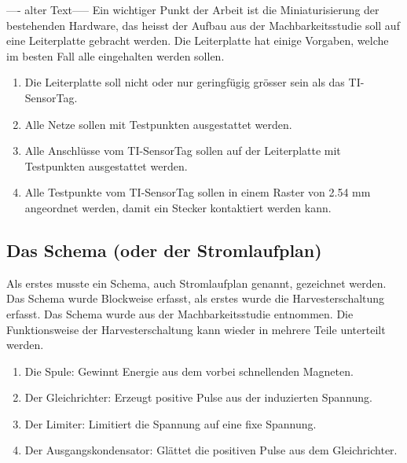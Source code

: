 ---- alter Text-----                             
Ein wichtiger Punkt der Arbeit ist die Miniaturisierung der bestehenden Hardware, das heisst der Aufbau aus der Machbarkeitsstudie soll auf eine Leiterplatte gebracht werden. Die Leiterplatte hat einige Vorgaben, welche im besten Fall alle eingehalten werden sollen.

\begin{enumerate}
    \item Die Leiterplatte soll nicht oder nur geringfügig grösser sein als das TI-SensorTag.
    
    \item Alle Netze sollen mit Testpunkten ausgestattet werden.
    
    \item Alle Anschlüsse vom TI-SensorTag sollen auf der Leiterplatte mit Testpunkten ausgestattet werden.
    
    \item Alle Testpunkte vom TI-SensorTag sollen in einem Raster von 2.54 mm angeordnet werden, damit ein Stecker kontaktiert werden kann.
    
\end{enumerate}
	


\subsection{Das Schema (oder der Stromlaufplan)}
Als erstes musste ein Schema, auch Stromlaufplan genannt, gezeichnet werden. Das Schema wurde Blockweise erfasst, als erstes wurde die Harvesterschaltung erfasst. Das Schema wurde aus der Machbarkeitsstudie entnommen. Die Funktionsweise der Harvesterschaltung kann wieder in mehrere Teile unterteilt werden.

\begin{enumerate}
    \item Die Spule: Gewinnt Energie aus dem vorbei schnellenden Magneten.
    
    \item Der Gleichrichter: Erzeugt positive Pulse aus der induzierten Spannung.
    
    \item Der Limiter: Limitiert die Spannung auf eine fixe Spannung.
    
    \item Der Ausgangskondensator: Glättet die positiven Pulse aus dem Gleichrichter.
    
\end{enumerate}

